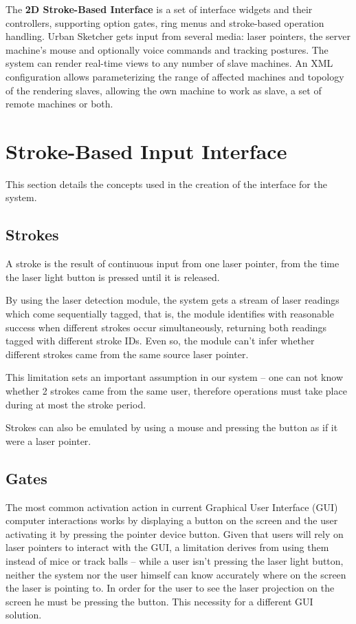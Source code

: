 The \textbf{2D Stroke-Based Interface} is 
		a set of interface widgets and their controllers,
		supporting option gates, ring menus and stroke-based operation handling.
Urban Sketcher gets input from several media:
laser pointers, the server machine's mouse and optionally voice commands and tracking postures.
The system can render real-time views to any number of slave machines.
An XML configuration allows parameterizing the range of affected machines and topology of the rendering slaves,
allowing the own machine to work as slave, a set of remote machines or both.


\section{Stroke-Based Input Interface}

This section details the concepts used in the creation of the interface for the system.

\subsection{Strokes}

A stroke is the result of continuous input from one laser pointer, from the time the laser
light button is pressed until it is released. 

By using the laser detection module, the system gets a stream of laser readings which
come sequentially tagged, that is, the module identifies with reasonable success when different strokes
occur simultaneously, returning both readings tagged with different stroke IDs.
Even so, the module can't infer whether different strokes came from the same source laser pointer.

This limitation sets an important assumption in our system -- one can not know whether 2 strokes came
from the same user, therefore operations must take place during at most the stroke period.

Strokes can also be emulated by using a mouse and pressing
the button as if it were a laser pointer.


\subsection{Gates}

The most common activation action in current Graphical User Interface (GUI) computer interactions works
by displaying a button on the screen and the user activating it by pressing the pointer device button.
Given that users will rely on laser pointers to interact with the GUI, a limitation derives from
using them instead of mice or track balls -- while a user isn't pressing the laser light button,
neither the system nor the user himself can know accurately where on the screen the laser is pointing to.
In order for the user to see the laser projection on the screen he must be pressing the button.
This necessity  for a different GUI solution.

